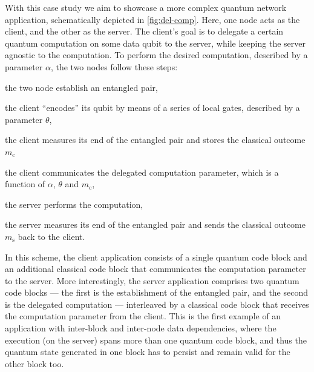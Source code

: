 With this case study we aim to showcase a more complex quantum network application, schematically
depicted in \cref{fig:del-comp}. Here, one node acts as the client, and the other as the server. The
client's goal is to delegate a certain quantum computation on some data qubit to the server, while
keeping the server agnostic to the computation. To perform the desired computation, described by a
parameter $\alpha$, the two nodes follow these steps:
%
\begin{inlinelist}
    \item the two node establish an entangled pair,
    \item the client ``encodes'' its qubit by means of a series of local gates, described by a
          parameter $\theta$,
    \item the client measures its end of the entangled pair and stores the classical outcome
          $m_\text{c}$
    \item the client communicates the delegated computation parameter, which is a function of
          $\alpha$, $\theta$ and $m_\text{c}$,
    \item the server performs the computation,
    \item the server measures its end of the entangled pair and sends the classical outcome
          $m_\text{s}$ back to the client.
\end{inlinelist}
In this scheme, the client application consists of a single quantum code block and an additional
classical code block that communicates the computation parameter to the server. More interestingly,
the server application comprises two quantum code blocks --- the first is the establishment of the
entangled pair, and the second is the delegated computation --- interleaved by a classical code
block that receives the computation parameter from the client. This is the first example of an
application with inter-block and inter-node data dependencies, where the execution (on the server)
spans more than one quantum code block, and thus the quantum state generated in one block has to
persist and remain valid for the other block too.

